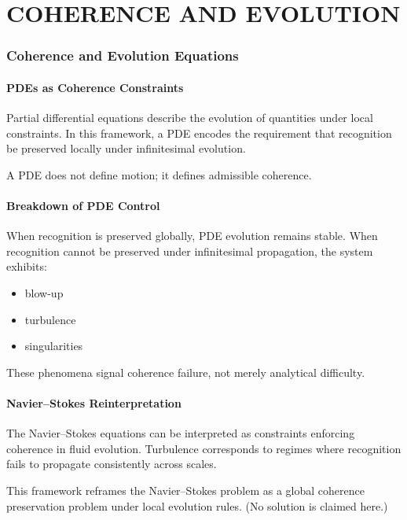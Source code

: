 \documentclass[12pt, oneside]{article}
\begin{document}
\newpage

\part{COHERENCE AND EVOLUTION}

\section{Coherence and Evolution Equations}

\subsection{PDEs as Coherence Constraints}

Partial differential equations describe the evolution of quantities under local constraints. In this framework, a PDE encodes the requirement that recognition be preserved locally under infinitesimal evolution.

A PDE does not define motion; it defines admissible coherence.

\subsection{Breakdown of PDE Control}

When recognition is preserved globally, PDE evolution remains stable. When recognition cannot be preserved under infinitesimal propagation, the system exhibits:
\begin{itemize}
    \item blow-up
    \item turbulence
    \item singularities
\end{itemize}
These phenomena signal coherence failure, not merely analytical difficulty.

\subsection{Navier--Stokes Reinterpretation}

The Navier--Stokes equations can be interpreted as constraints enforcing coherence in fluid evolution. Turbulence corresponds to regimes where recognition fails to propagate consistently across scales.

This framework reframes the Navier--Stokes problem as a global coherence preservation problem under local evolution rules. (No solution is claimed here.)
\end{document}
